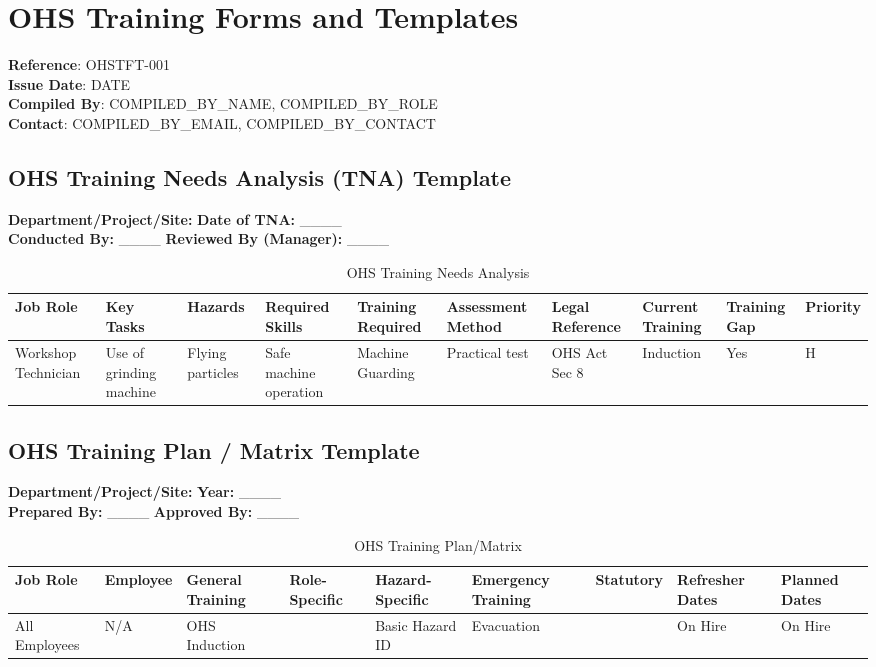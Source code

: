 \documentclass[11pt]{article}
\newcommand{\docTitle}{OHS Training Forms and Templates}
\newcommand{\refNumber}{OHSTFT-001}
\newcommand{\issueDate}{{{DATE}}}
\newcommand{\location}{}
\newcommand{\compilerName}{{{COMPILED_BY_NAME}}}
\newcommand{\compilerRole}{{{COMPILED_BY_ROLE}}}
\newcommand{\compilerEmail}{{{COMPILED_BY_EMAIL}}}
\newcommand{\compilerPhone}{{{COMPILED_BY_CONTACT}}}
\begin{document}
\section*{\docTitle}
\textbf{Reference}: \refNumber \\
\textbf{Issue Date}: \issueDate \\
\textbf{Compiled By}: \compilerName, \compilerRole \\
\textbf{Contact}: \compilerEmail, \compilerPhone

\subsection*{OHS Training Needs Analysis (TNA) Template}

\textbf{Department/Project/Site:} \location \textbf{Date of TNA:} \_\_\_\_ \\
\textbf{Conducted By:} \_\_\_\_ \textbf{Reviewed By (Manager):} \_\_\_\_

\begin{table}[h]
    \centering
    \begin{tabular}{p{2cm}p{3cm}p{2cm}p{2cm}p{3cm}p{2cm}p{2cm}p{2cm}p{2cm}p{2cm}}
        \toprule
        \textbf{Job Role} & \textbf{Key Tasks} & \textbf{Hazards} & \textbf{Required Skills} & \textbf{Training Required} & \textbf{Assessment Method} & \textbf{Legal Reference} & \textbf{Current Training} & \textbf{Training Gap} & \textbf{Priority} \\
        \midrule
        Workshop Technician & Use of grinding machine & Flying particles & Safe machine operation & Machine Guarding & Practical test & OHS Act Sec 8 & Induction & Yes & H \\
        \bottomrule
    \end{tabular}
    \caption{OHS Training Needs Analysis}
\end{table}

\subsection*{OHS Training Plan / Matrix Template}

\textbf{Department/Project/Site:} \location \textbf{Year:} \_\_\_\_ \\
\textbf{Prepared By:} \_\_\_\_ \textbf{Approved By:} \_\_\_\_

\begin{table}[h]
    \centering
    \begin{tabular}{p{2cm}p{2cm}p{2cm}p{2cm}p{2cm}p{2cm}p{2cm}p{2cm}p{2cm}}
        \toprule
        \textbf{Job Role} & \textbf{Employee} & \textbf{General Training} & \textbf{Role-Specific} & \textbf{Hazard-Specific} & \textbf{Emergency Training} & \textbf{Statutory} & \textbf{Refresher Dates} & \textbf{Planned Dates} \\
        \midrule
        All Employees & N/A & OHS Induction & & Basic Hazard ID & Evacuation & & On Hire & On Hire \\
        \bottomrule
    \end{tabular}
    \caption{OHS Training Plan/Matrix}
\end{table}
\end{document}
